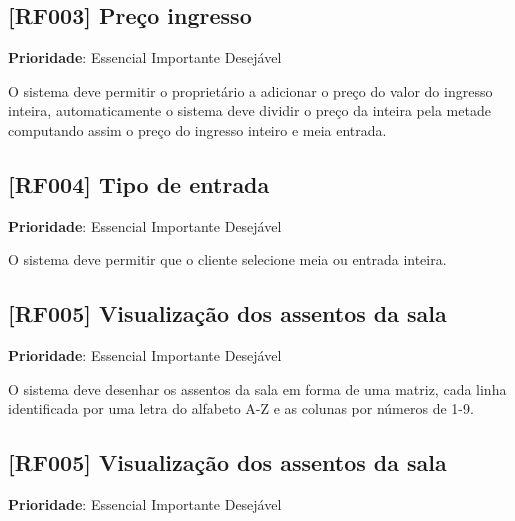 \documentclass[12pt,a4paper]{article}
\begin{document}
\subsection{[RF003] Preço ingresso}

\textbf{Prioridade}:
\mbox{\ooalign{$\checkmark$\cr\hidewidth$\square$\hidewidth\cr}} Essencial
\mbox{\ooalign{\cr\hidewidth$\square$\hidewidth\cr}} Importante
\mbox{\ooalign{\cr\hidewidth$\square$\hidewidth\cr}} Desejável

O sistema deve permitir o proprietário a adicionar o preço do valor do
ingresso inteira, automaticamente o sistema deve dividir o preço da inteira
pela metade computando assim o preço do ingresso inteiro e meia entrada.

\subsection{[RF004] Tipo de entrada}

\textbf{Prioridade}:
\mbox{\ooalign{$\checkmark$\cr\hidewidth$\square$\hidewidth\cr}} Essencial
\mbox{\ooalign{\cr\hidewidth$\square$\hidewidth\cr}} Importante
\mbox{\ooalign{\cr\hidewidth$\square$\hidewidth\cr}} Desejável

O sistema deve permitir que o cliente selecione meia ou entrada inteira.

\subsection{[RF005] Visualização dos assentos da sala}

\textbf{Prioridade}:
\mbox{\ooalign{$\checkmark$\cr\hidewidth$\square$\hidewidth\cr}} Essencial
\mbox{\ooalign{\cr\hidewidth$\square$\hidewidth\cr}} Importante
\mbox{\ooalign{\cr\hidewidth$\square$\hidewidth\cr}} Desejável

O sistema deve desenhar os assentos da sala em forma de uma matriz, cada
linha identificada por uma letra do alfabeto A-Z e as colunas por números de
1-9.

\subsection{[RF005] Visualização dos assentos da sala}

\textbf{Prioridade}:
\mbox{\ooalign{$\checkmark$\cr\hidewidth$\square$\hidewidth\cr}} Essencial
\mbox{\ooalign{\cr\hidewidth$\square$\hidewidth\cr}} Importante
\mbox{\ooalign{\cr\hidewidth$\square$\hidewidth\cr}} Desejável
\end{document}
